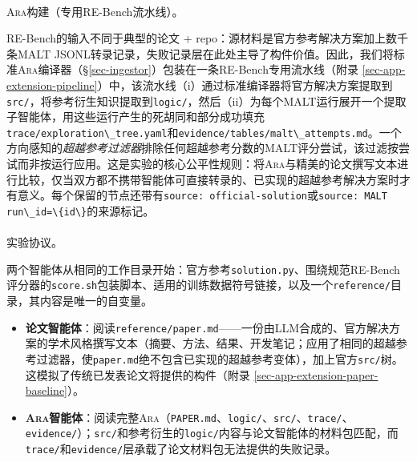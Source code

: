 \documentclass[
]{article}
\makeatletter
\let\oldparagraph\paragraph
\renewcommand{\paragraph}{
    \@ifstar
      \xxxParagraphStar
      \xxxParagraphNoStar
  }
\newcommand{\xxxParagraphStar}[1]{\oldparagraph*{#1}\mbox{}}
\newcommand{\xxxParagraphNoStar}[1]{\oldparagraph{#1}\mbox{}}
\newcommand{\passthrough}[1]{#1}
\providecommand{\tightlist}{%
  \setlength{\itemsep}{0pt}\setlength{\parskip}{0pt}}
\theoremstyle{definition}
\newcommand{\ara}{\textsc{Ara}}
\makeatother
\begin{document}
\paragraph{\texorpdfstring{\ara{}构建（专用RE-Bench流水线）。}{构建（专用RE-Bench流水线）。}}\label{b58fc729-690b-4000-b19f-365a4093b2ff7b7b3c207465726d20617261203e7d7dux6784ux5efaux4e13ux7528re-benchux6d41ux6c34ux7ebf}

RE-Bench的输入不同于典型的论文 +
repo：源材料是官方参考解决方案加上数千条MALT
JSONL转录记录，失败记录层在此处主导了构件价值。因此，我们将标准\ara{}编译器（\S\ref{sec-ingestor}）包装在一条RE-Bench专用流水线（附录
\ref{sec-app-extension-pipeline}）中，该流水线（i）通过标准编译器将官方解决方案提取到\passthrough{\lstinline!src/!}，将参考衍生知识提取到\passthrough{\lstinline!logic/!}，然后（ii）为每个MALT运行展开一个提取子智能体，用这些运行产生的死胡同和部分成功填充\passthrough{\lstinline!trace/exploration\_tree.yaml!}和\passthrough{\lstinline!evidence/tables/malt\_attempts.md!}。一个方向感知的\emph{超越参考过滤器}排除任何超越参考分数的MALT评分尝试，该过滤按尝试而非按运行应用。这是实验的核心公平性规则：将\ara{}与精美的论文撰写文本进行比较，仅当双方都不携带智能体可直接转录的、已实现的超越参考解决方案时才有意义。每个保留的节点还带有\passthrough{\lstinline!source: official-solution!}或\passthrough{\lstinline!source: MALT run\_id=\{id\}!}的来源标记。

\paragraph{实验协议。}\label{ux5b9eux9a8cux534fux8bae-1}

两个智能体从相同的工作目录开始：官方参考\passthrough{\lstinline!solution.py!}、围绕规范RE-Bench评分器的\passthrough{\lstinline!score.sh!}包装脚本、适用的训练数据符号链接，以及一个\passthrough{\lstinline!reference/!}目录，其内容是唯一的自变量。

\begin{itemize}
\tightlist
\item
  \textbf{论文智能体}：阅读\passthrough{\lstinline!reference/paper.md!}------一份由LLM合成的、官方解决方案的学术风格撰写文本（摘要、方法、结果、开发笔记；应用了相同的超越参考过滤器，使\passthrough{\lstinline!paper.md!}绝不包含已实现的超越参考变体），加上官方\passthrough{\lstinline!src/!}树。这模拟了传统已发表论文将提供的构件（附录
  \ref{sec-app-extension-paper-baseline}）。
\item
  \textbf{\ara{}智能体}：阅读完整\ara{}（\passthrough{\lstinline!PAPER.md!}、\passthrough{\lstinline!logic/!}、\passthrough{\lstinline!src/!}、\passthrough{\lstinline!trace/!}、\passthrough{\lstinline!evidence/!}）；\passthrough{\lstinline!src/!}和参考衍生的\passthrough{\lstinline!logic/!}内容与论文智能体的材料包匹配，而\passthrough{\lstinline!trace/!}和\passthrough{\lstinline!evidence/!}层承载了论文材料包无法提供的失败记录。
\end{itemize}
\end{document}
